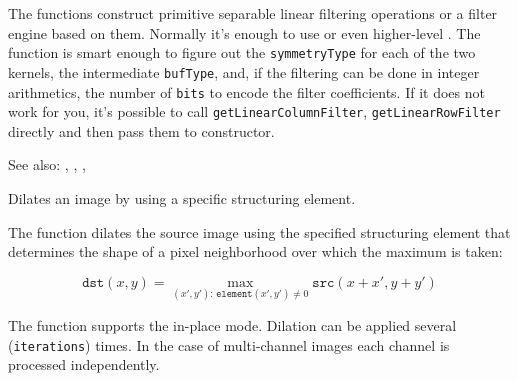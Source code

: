 The functions construct primitive separable linear filtering operations or a filter engine based on them. Normally it's enough to use  or even higher-level . The function  is smart enough to figure out the \texttt{symmetryType} for each of the two kernels, the intermediate \texttt{bufType}, and, if the filtering can be done in integer arithmetics, the number of \texttt{bits} to encode the filter coefficients. If it does not work for you, it's possible to call \texttt{getLinearColumnFilter}, \texttt{getLinearRowFilter} directly and then pass them to  constructor.

See also: , , , 


Dilates an image by using a specific structuring element.

\begin{description}
\end{description}

The function dilates the source image using the specified structuring element that determines the shape of a pixel neighborhood over which the maximum is taken:

\[
\texttt{dst}(x,y) = \max_{(x',y'): \, \texttt{element}(x',y')\ne0}\texttt{src}(x+x',y+y')
\]

The function supports the in-place mode. Dilation can be applied several (\texttt{iterations}) times. In the case of multi-channel images each channel is processed independently.

